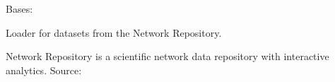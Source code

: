 \documentclass[letterpaper,10pt,english]{sphinxmanual}
\begin{document}
\begin{fulllineitems}
\label{\detokenize{graphem:graphem.datasets.NetworkRepositoryDataset}}
\pysigstartsignatures
{}
\pysigstopsignatures
\sphinxAtStartPar
Bases: {\hyperref[\detokenize{graphem:graphem.datasets.DatasetLoader}]{}}

\sphinxAtStartPar
Loader for datasets from the Network Repository.

\sphinxAtStartPar
Network Repository is a scientific network data repository with interactive analytics.
Source: 


\end{fulllineitems}
\end{document}
